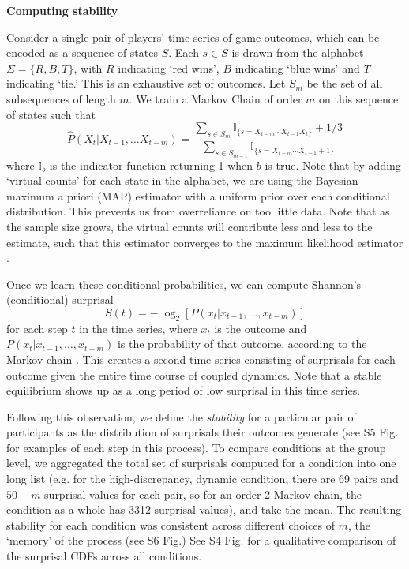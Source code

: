 \documentclass[11pt, oneside]{article}   	%
\begin{document}
\noindent\textbf{Computing stability}


Consider a single pair of players' time series of game outcomes, which can be encoded as a sequence of states $S$. Each $s \in S$ is drawn from the alphabet $\Sigma = \{R, B, T\}$, with $R$ indicating `red wins', $B$ indicating `blue wins' and $T$ indicating `tie.' This is an exhaustive set of outcomes. Let $S_m$ be the set of all subsequences of length $m$. We train a Markov Chain of order $m$ on this sequence of states such that $$\widehat{P}(X_t | X_{t-1}, \dots X_{t-m}) = \frac{\sum_{s\in S_m} \mathbb{I}_{\{s = X_{t-m}\cdots X_{t-1}X_t\}} + 1/3}{\sum_{s\in S_{m-1}} \mathbb{I}_{\{s = X_{t-m}\cdots X_{t-1} + 1\}}}$$ where $\mathbb{I}_{b}$ is the indicator function returning 1 when $b$ is true. Note that by adding `virtual counts' for each state in the alphabet, we are using the Bayesian maximum a priori (MAP) estimator with a uniform prior over each conditional distribution. This prevents us from overreliance on too little data. Note that as the sample size grows, the virtual counts will contribute less and less to the estimate, such that this estimator converges to the maximum likelihood estimator \cite{YoungSmith05_StatisticalInference}.

Once we learn these conditional probabilities, we can compute Shannon's (conditional) surprisal  $$S(t) = -\log_2[P(x_t | x_{t-1}, \dots, x_{t-m})]$$ for each step $t$ in the time series, where $x_t$ is the outcome and $P(x_t | x_{t-1}, \dots, x_{t-m})$ is the probability of that outcome, according to the Markov chain \cite{Shannon48}. This creates a second time series consisting of surprisals for each outcome given the entire time course of coupled dynamics. Note that a stable equilibrium shows up as a long period of low surprisal in this time series. 

Following this observation, we define the \emph{stability} for a particular pair of participants as the distribution of surprisals their outcomes generate (see S5 Fig. for examples of each step in this process). To compare conditions at the group level, we aggregated the total set of surprisals computed for a condition into one long list (e.g. for the high-discrepancy, dynamic condition, there are 69 pairs and $50 - m$ surprisal values for each pair, so for an order 2 Markov chain, the condition as a whole has 3312 surprisal values), and take the mean. The resulting stability for each condition was consistent across different choices of $m$, the `memory' of the process (see S6 Fig.) See S4 Fig. for a qualitative comparison of the surprisal CDFs across all conditions.



\end{document}
